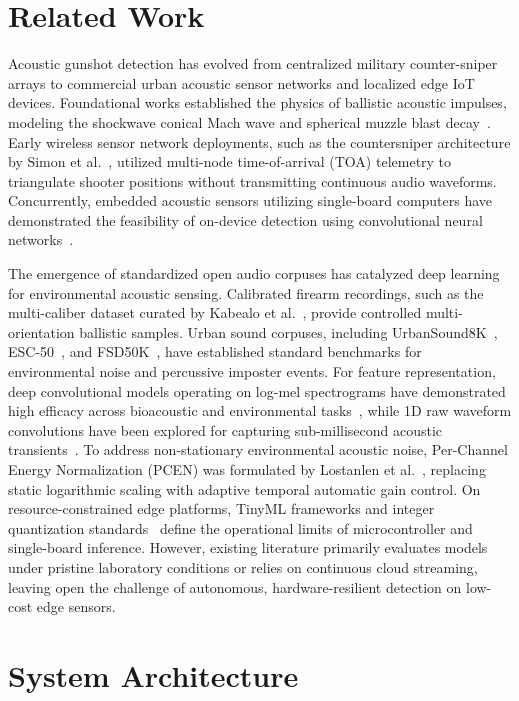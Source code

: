 \documentclass[conference]{IEEEtran}
\begin{document}
\section{Related Work}
\label{sec:related}

Acoustic gunshot detection has evolved from centralized military counter-sniper arrays to commercial urban acoustic sensor networks and localized edge IoT devices. Foundational works established the physics of ballistic acoustic impulses, modeling the shockwave conical Mach wave and spherical muzzle blast decay~\cite{maher2007}. Early wireless sensor network deployments, such as the countersniper architecture by Simon et al.~\cite{simon2004}, utilized multi-node time-of-arrival (TOA) telemetry to triangulate shooter positions without transmitting continuous audio waveforms. Concurrently, embedded acoustic sensors utilizing single-board computers have demonstrated the feasibility of on-device detection using convolutional neural networks~\cite{valero2020}.

The emergence of standardized open audio corpuses has catalyzed deep learning for environmental acoustic sensing. Calibrated firearm recordings, such as the multi-caliber dataset curated by Kabealo et al.~\cite{dib2023}, provide controlled multi-orientation ballistic samples. Urban sound corpuses, including UrbanSound8K~\cite{salamon2014}, ESC-50~\cite{piczak2015}, and FSD50K~\cite{fonseca2021}, have established standard benchmarks for environmental noise and percussive imposter events. For feature representation, deep convolutional models operating on log-mel spectrograms have demonstrated high efficacy across bioacoustic and environmental tasks~\cite{hershey2017, saha2025}, while 1D raw waveform convolutions have been explored for capturing sub-millisecond acoustic transients~\cite{dai2017}. To address non-stationary environmental acoustic noise, Per-Channel Energy Normalization (PCEN) was formulated by Lostanlen et al.~\cite{lostanlen2019}, replacing static logarithmic scaling with adaptive temporal automatic gain control. On resource-constrained edge platforms, TinyML frameworks and integer quantization standards~\cite{banbury2021, david2021, cerutti2021} define the operational limits of microcontroller and single-board inference. However, existing literature primarily evaluates models under pristine laboratory conditions or relies on continuous cloud streaming, leaving open the challenge of autonomous, hardware-resilient detection on low-cost edge sensors.

\section{System Architecture}
\label{sec:system_arch}
\end{document}
